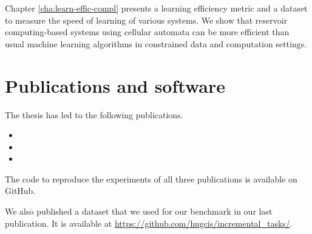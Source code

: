 Chapter \ref{cha:learn-effic-compl} presents a learning efficiency metric and a
dataset to measure the speed of learning of various systems. We show that
reservoir computing-based systems using cellular automata can be more efficient
than usual machine learning algorithms in constrained data and computation
settings.


\section{Publications and software}

The thesis has led to the following publications.

\begin{itemize}
  \item {}
  \item {}
  \item {}
\end{itemize}

The code to reproduce the experiments of all three publications is available on
GitHub.

We also published a dataset that we used for our benchmark in our last
publication. It is available at
\url{https://github.com/hugcis/incremental_tasks/}.
